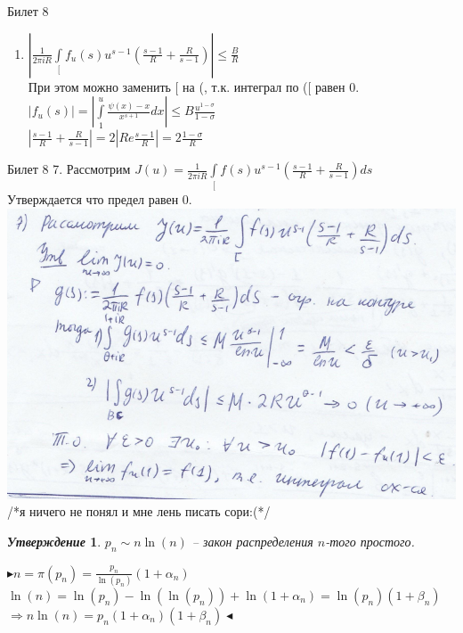 \documentclass[a4paper,12pt]{article}
\newtheorem{utv}{\textit{Утверждение}}
\newcommand{\SI}{\psi}
\newcommand{\q}{\quad}
\newcommand{\pb}{\blacktriangleright}
\newcommand{\pe}{\blacktriangleleft}
\newcommand{\Ra}{\Rightarrow}
\newcommand{\IL}{\int\limits}
\newcommand{\os}{\left(}
\newcommand{\cs}{\right)}
\begin{document}
\begin{mybox2}{\hypertarget{bil8}{Билет 8}}
\begin{enumerate}
$\pb |f(s) - f_u(s)| = \left| \IL_u^\infty \frac{\SI(x) - x}{x^{s+1}}dx   \right| \le \IL_u^\infty \frac{Bx}{x^{s+1}}dx = \left.B\frac{x^{1-\sigma}}{1-\sigma}\right|_u^\infty = \frac{Bu^{1-\sigma}}{\sigma - 1}  $\\
$\Ra \left| \frac{s-1}{R} + \frac{R}{s-1}  \right| = 2 |Re\frac{s-1}{R}| = 2 \frac{\sigma - 1}{R} \pe$
\item $\left| \frac{1}{2\pi i R}\IL_[ f_u(s)u^{s-1} \os   \frac{s-1}{R} + \frac{R}{s-1} \cs   \right| \le \frac{B}{R}$\\
При этом можно заменить [ на (, т.к. интеграл по ([ равен 0.\\
$|f_u(s)| = |\IL_1^u \frac{\SI(x)-x}{x^{s+1}}dx|\le B \frac{u^{1-\sigma}}{1-\sigma}$\\
$|  \frac{s-1}{R} + \frac{R}{s-1} | = 2 |Re \frac{s-1}{R}| = 2 \frac{1 - \sigma}{R}$
\end{enumerate}

\end{mybox2}
\newpage
\begin{mybox2}{{Билет 8}}
7. Рассмотрим $J(u) = \frac{1}{2\pi i R} \IL_[ f(s)u^{s-1} \os   \frac{s-1}{R} + \frac{R}{s-1} \cs ds$\\
Утверждается что предел равен 0.\\
\includegraphics{p2.png}\q\\
/*я ничего не понял и мне лень писать сори:(*/

\begin{formbox}{}
\begin{utv} $p_n \sim n\ln(n)$ -- закон распределения $n$-того простого.
\end{utv}
\end{formbox}
$\pb n = \pi(p_n) = \frac{p_n}{\ln(p_n)}(1+\alpha_n) $\\
$\ln(n)  = \ln(p_n) - \ln(\ln(p_n)) + \ln(1+\alpha_n) = \ln(p_n)(1 + \beta_n)  $\\
$\Ra n\ln(n) = p_n(1 + \alpha_n)(1 + \beta_n) \pe $
\end{mybox2}
\end{document}
